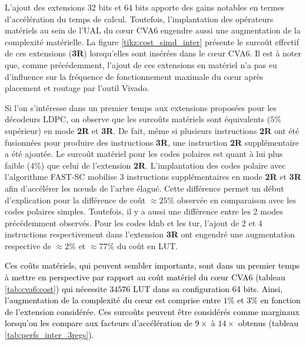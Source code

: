 \documentclass[../main.tex]{subfiles}
\begin{document}
L'ajout des extensions 32 bits et 64 bits apporte des gains notables en termes d'accélération du temps de calcul.
Toutefois, l'implantation des opérateurs matériels au sein de l'UAL du cœur CVA6 engendre aussi une augmentation de la complexité matérielle.
La figure \ref{tikz:cost_simd_inter} présente le surcoût effectif de ces extensions (\textbf{3R}) lorsqu'elles sont insérées dans le cœur CVA6. Il est à noter que, comme précédemment, l'ajout de ces extensions en matériel n'a pas eu d'influence sur la fréquence de fonctionnement maximale du cœur après placement et routage par l'outil Vivado.

Si l'on s'intéresse dans un premier temps aux extensions proposées pour les décodeurs LDPC, on observe que les surcoûts matériels sont équivalents ($5\%$ supérieur) en mode \textbf{2R} et \textbf{3R}. 
De fait, même si plusieurs instructions \textbf{2R} ont été fusionnées pour produire des instructions \textbf{3R}, une instruction \textbf{2R} supplémentaire a été ajoutée. 
Le surcoût matériel pour les codes polaires est quant à lui plus faible (4\%) que celui de l'extension \textbf{2R}.
L'implantation des codes polaire avec l'algorithme FAST-SC mobilise 3 instructions supplémentaires en mode \textbf{2R} et \textbf{3R} afin d'accélérer les nœuds de l'arbre élagué. Cette différence permet un début d'explication pour la différence de coût $\approx 25\%$ observée en comparaison avec les codes polaires simples. Toutefois, il y a aussi une différence entre les 2 modes précédemment observés.
Pour les codes \acrlong{ldnb} et les \acrlong{tur}, l'ajout de $2$ et $4$ instructions respectivement dans l'extension \textbf{3R} ont engendré une augmentation respective de $\approx 2\%$ et $\approx 77\%$ du coût en LUT.

\textcolor{black}{Ces coûts matériels, qui peuvent sembler importants, sont dans un premier temps à mettre en perspective par rapport au coût matériel du cœur CVA6 (tableau \ref{tab:cva6:cost}) qui nécessite $34576$ LUT dans sa configuration 64 bits.
Ainsi, l'augmentation de la complexité du cœur est comprise entre $1\%$ et $3\%$ en fonction de l'extension considérée.
Ces surcoûts peuvent être considérés comme marginaux lorsqu'on les compare aux facteurs d'accélération de $9\times$ à $14\times$ obtenus (tableau \ref{tab:perfs_inter_3regs}).}
\end{document}
